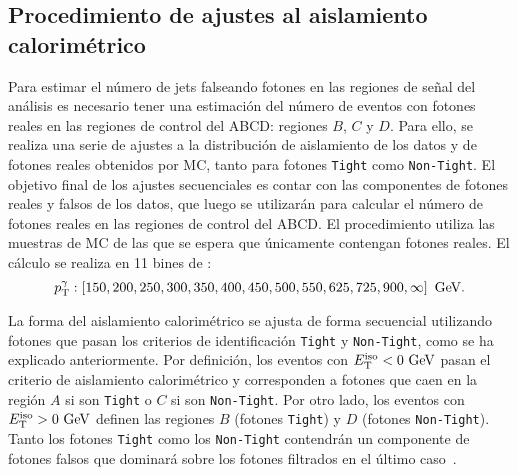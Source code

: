 \subsection{Procedimiento de ajustes al aislamiento calorimétrico}
\label{subsec:bkg:estimation:fits}


Para estimar el número de jets falseando fotones en las regiones de señal del análisis es necesario tener una estimación del número de eventos con fotones reales en las regiones de control del ABCD: regiones \(B\), \(C\) y \(D\). Para ello, se realiza una serie de ajustes a la distribución de aislamiento de los datos y de fotones reales obtenidos por \ac{MC}, tanto para fotones \texttt{Tight} como \texttt{Non-Tight}. El objetivo final de los ajustes secuenciales es contar con las componentes de fotones reales y falsos de los datos, que luego se utilizarán para calcular el número de fotones reales en las regiones de control del ABCD. El procedimiento utiliza las muestras de \ac{MC} de las que se espera que únicamente contengan fotones reales. El cálculo se realiza en 11 bines de \ptgam:
\begin{equation*}
    p_{\text{T}}^{\gamma}: \left[ 150, 200, 250, 300, 350, 400, 450, 500, 550, 625, 725, 900, \infty \right]~\text{GeV}.
\end{equation*}


La forma del aislamiento calorimétrico \etiso se ajusta de forma secuencial utilizando fotones que pasan los criterios de identificación \texttt{Tight} y \texttt{Non-Tight}, como se ha explicado anteriormente.
Por definición, los eventos con \(E_{\text{T}}^{\text{iso}}<0~\text{GeV}\) pasan el criterio de aislamiento calorimétrico y corresponden a fotones que caen en la región \(A\) si son \texttt{Tight} o \(C\) si son \texttt{Non-Tight}. Por otro lado, los eventos con \(E_{\text{T}}^{\text{iso}}>0~\text{GeV}\) definen las regiones \(B\) (fotones \texttt{Tight}) y \(D\) (fotones \texttt{Non-Tight}).
Tanto los fotones \texttt{Tight} como los \texttt{Non-Tight} contendrán un componente de fotones falsos que dominará sobre los fotones filtrados en el último caso~\cite{ATLAS-DiPhotonSearchIsolation-NOTE,ATLAS-EleMuPhoIsolation-NOTE}.

